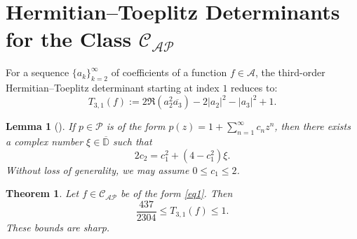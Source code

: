 \documentclass[11pt]{article}
\newtheorem{theo}{Theorem}[section]
\newtheorem{lem}{Lemma}[section]
\newcommand{\ol}{\overline}
\numberwithin{equation}{section}
\begin{document}
\section{Hermitian--Toeplitz Determinants for the Class $\mathcal{C}_{\mathcal{AP}}$}
For a sequence $\{a_k\}_{k=2}^{\infty}$ of coefficients of a function $f \in \mathcal{A}$, the third-order Hermitian--Toeplitz determinant starting at index $1$ reduces to:
\begin{equation}\label{po18}
T_{3,1}(f) := 2\Re\left(a_{2}^{2}\overline{a_{3}}\right) - 2|a_{2}|^{2} - |a_{3}|^{2} + 1.
\end{equation}

\begin{lem}[\cite{LZ}]\label{lem_LZ}
If $p \in \mathcal{P}$ is of the form $p(z) = 1 + \sum_{n=1}^{\infty} c_n z^n$, then there exists a complex number $\xi \in \ol{\mathbb{D}}$ such that
\begin{equation}\label{po19}
2c_{2} = c_{1}^{2} + (4 - c_{1}^{2})\xi.
\end{equation}
Without loss of generality, we may assume $0 \le c_1 \le 2$.
\end{lem}

\begin{theo}\label{T5}
Let $f \in \mathcal{C}_{\mathcal{AP}}$ be of the form \eqref{eq1}. Then
\[
\frac{437}{2304} \le T_{3,1}(f) \le 1.
\]
These bounds are sharp.
\end{theo}
\end{document}
